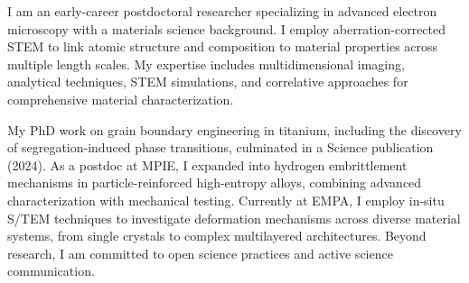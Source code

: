\begin{justify}
{I am an early-career postdoctoral researcher specializing in advanced electron microscopy with a materials science background. I employ aberration-corrected STEM to link atomic structure and composition to material properties across multiple length scales. My expertise includes multidimensional imaging, analytical techniques, STEM simulations, and correlative approaches for comprehensive material characterization. \\

\par
My PhD work on grain boundary engineering in titanium, including the discovery of segregation-induced phase transitions, culminated in a Science publication (2024). As a postdoc at MPIE, I expanded into hydrogen embrittlement mechanisms in particle-reinforced high-entropy alloys, combining advanced characterization with mechanical testing. Currently at EMPA, I employ in-situ S/TEM techniques to investigate deformation mechanisms across diverse material systems, from single crystals to complex multilayered architectures. Beyond research, I am committed to open science practices and active science communication.}

\end{justify}
